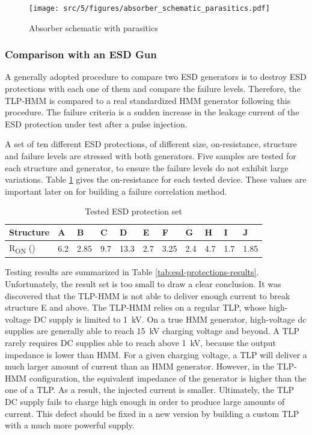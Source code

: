 \begin{figure}[!h]
  \centering
  \texttt{[image: src/5/figures/absorber\_schematic\_parasitics.pdf]}
  \caption{Absorber schematic with parasitics}
  \label{fig:absorber_schematic_parasitics}
\end{figure}

\subsubsection{Comparison with an ESD Gun}

A generally adopted procedure to compare two ESD generators is to destroy ESD protections with each one of them and compare the failure levels.
Therefore, the TLP-HMM is compared to a real standardized HMM generator following this procedure.
The failure criteria is a sudden increase in the leakage current of the ESD protection under test after a pulse injection.

A set of ten different ESD protections, of different size, on-resistance, structure and failure levels are stressed with both generators.
Five samples are tested for each structure and generator, to ensure the failure levels do not exhibit large variations.
Table \ref{tab:esd-protections} gives the on-resistance for each tested device.
These values are important later on for building a failure correlation method.

\begin{table}[!h]
\centering
\begin{tabular}{@{}lllllllllll@{}}
\toprule
Structure                          & A    & B    & C     & D    & E   & F   & G   & H   & I   & J   \\ \midrule
R\textsubscript{ON} (\textOmega{}) & 6.2  & 2.85 & 9.7  & 13.3 & 2.7 & 3.25& 2.4 & 4.7 & 1.7 & 1.85 \\
\end{tabular}
\caption{Tested ESD protection set}
\label{tab:esd-protections}
\end{table}

Testing results are summarized in Table \ref{tab:esd-protections-results}.
Unfortunately, the result set is too small to draw a clear conclusion.
It was discovered that the TLP-HMM is not able to deliver enough current to break structure E and above.
The TLP-HMM relies on a regular TLP, whose high-voltage DC supply is limited to \SI{1}{\kilo\volt}.
On a true HMM generator, high-voltage \gls{dc} supplies are generally able to reach \SI{15}{\kilo\volt} charging voltage and beyond.
A TLP rarely requires DC supplies able to reach above \SI{1}{\kilo\volt}, because the output impedance is lower than HMM.
For a given charging voltage, a TLP will deliver a much larger amount of current than an HMM generator.
However, in the TLP-HMM configuration, the equivalent impedance of the generator is higher than the one of a TLP.
As a result, the injected current is smaller.
Ultimately, the TLP DC supply fails to charge high enough in order to produce large amounts of current.
This defect should be fixed in a new version by building a custom TLP with a much more powerful supply.

